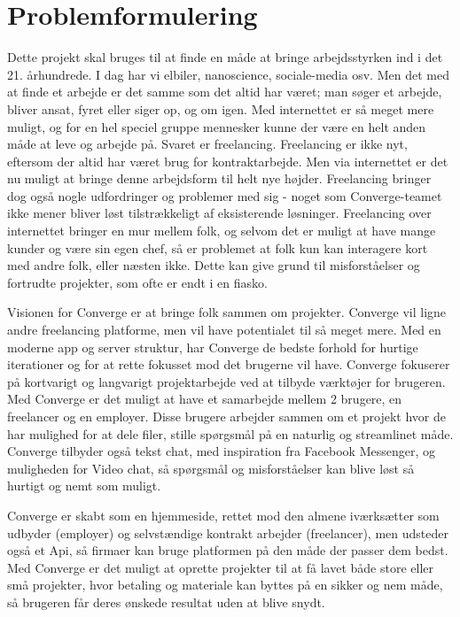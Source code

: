 \section{Problemformulering}

Dette projekt skal bruges til at finde en måde at bringe arbejdsstyrken ind i det 21. århundrede. I dag har vi elbiler, nanoscience, sociale-media osv. Men det med at finde et arbejde er det samme som det altid har været; man søger et arbejde, bliver ansat, fyret eller siger op, og om igen. Med internettet er så meget mere muligt, og for en hel speciel gruppe mennesker kunne der være en helt anden måde at leve og arbejde på. Svaret er freelancing. Freelancing er ikke nyt, eftersom der altid har været brug for kontraktarbejde. Men via internettet er det nu muligt at bringe denne arbejdsform til helt nye højder. Freelancing bringer dog også nogle udfordringer og problemer med sig - noget som Converge-teamet ikke mener bliver løst tilstrækkeligt af eksisterende løsninger. Freelancing over internettet bringer en mur mellem folk, og selvom det er muligt at have mange kunder og være sin egen chef, så er problemet at folk kun kan interagere kort med andre folk, eller næsten ikke. Dette kan give grund til misforståelser og fortrudte projekter, som ofte er endt i en fiasko.

Visionen for Converge er at bringe folk sammen om projekter. Converge vil ligne andre freelancing platforme, men vil have potentialet til så meget mere. Med en moderne app og server struktur, har Converge de bedste forhold for hurtige iterationer og for at rette fokusset mod det brugerne vil have. Converge fokuserer på kortvarigt og langvarigt projektarbejde ved at tilbyde værktøjer for brugeren. Med Converge er det muligt at have et samarbejde mellem 2 brugere, en freelancer og en employer. Disse brugere arbejder sammen om et projekt hvor de har mulighed for at dele filer, stille spørgsmål på en naturlig og streamlinet måde. Converge tilbyder også tekst chat, med inspiration fra Facebook Messenger, og muligheden for Video chat, så spørgsmål og misforståelser kan blive løst så hurtigt og nemt som muligt.

Converge er skabt som en hjemmeside, rettet mod den almene iværksætter som udbyder (employer) og selvstændige kontrakt arbejder (freelancer), men udsteder også et Api, så firmaer kan bruge platformen på den måde der passer dem bedst. Med Converge er det muligt at oprette projekter til at få lavet både store eller små projekter, hvor betaling og materiale kan byttes på en sikker og nem måde, så brugeren får deres ønskede resultat uden at blive snydt.
